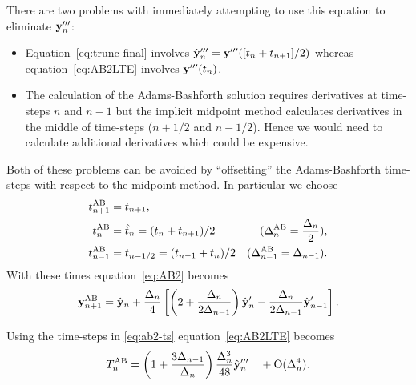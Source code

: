 
There are two problems with immediately attempting to use this equation to eliminate $\mathbf{y}'''_n$:
\begin{itemize}
\item Equation~\eqref{eq:trunc-final} involves $\hat{\mathbf{y}}_{n}''' = \mathbf{y}'''([t_n +t_{n+1}]/2)$ whereas equation~\eqref{eq:AB2LTE} involves $\mathbf{y}'''(t_n)$.
\item The calculation of the Adams-Bashforth solution requires derivatives at time-steps $n$ and $n-1$ but the implicit midpoint method calculates derivatives in the middle of time-steps (\ie $n+ 1/2$ and $n - 1/2$).
  Hence we would need to calculate additional derivatives which could be expensive.
\end{itemize}

Both of these problems can be avoided by ``offsetting'' the Adams-Bashforth time-steps with respect to the midpoint method.
In particular we choose
\begin{align}
  t_{n+1}^{\text{AB}} &= t_{n+1}, \notag\\
  t_n^{\text{AB}} &= \hat{t}_{n} = (t_{n} + t_{n+1})/2 &(\Delta_{n}^{\text{AB}} = \frac{\Delta_{n}}{2}), \notag \\
  t_{n-1}^{\text{AB}} &= t_{n - 1/2} = (t_{n-1} + t_n)/2  &(\Delta_{n-1}^{\text{AB}} = \Delta_{n-1}).
  \label{eq:ab2-ts}
\end{align}
With these times equation~\eqref{eq:AB2} becomes
\begin{equation}
   \mathbf{y}_{n+1}^{\text{AB}} = \hat{\mathbf{y}}_{n} + \frac{\Delta_{n}}{4} \left[
     \left (2 + \frac{\Delta_{n}}{2\Delta_{n-1}} \right) \hat{\mathbf{y}}_{n}'
     - \frac{\Delta_{n}}{2\Delta_{n-1}} \hat{\mathbf{y}}_{n-1}'
     \right].
   \label{eq:AB2-mid}
\end{equation}

Using the time-steps in \eqref{eq:ab2-ts} equation~\eqref{eq:AB2LTE} becomes
\begin{equation}
  \lte^\AB %
  = \left( 1 + \frac{3 \dtx{n-1}}{\dtn} \right) \frac{\dtn^3}{48} \yvhf'''
  \porder{\dtn^4}.
\label{eq:AB2-mid-LTE}
\end{equation}

